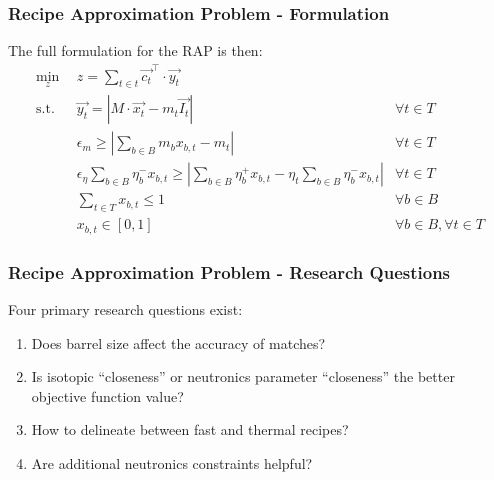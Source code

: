 \begin{frame}[ctb!]
  \frametitle{Recipe Approximation Problem - Formulation}

  The full formulation for the RAP is then:
  \fontsize{7pt}{\baselineskip}\selectfont
  \begin{subequations}\label{eqs:rap}
    \begin{align}
      \min_{z} \:\: & 
      z = \sum_{t \in t} \vec{c_{t}}^{\top} \cdot \vec{y_{t}}
      & \label{eqs:rap_obj} \\
      \text{s.t.} \:\: &
      \vec{y_{t}} = \left| M \cdot \vec{x_{t}}  - m_t \vec{I_{t}} \right|
      &
      \forall t \in T \label{eqs:rap_iso} \\
      &
      \epsilon_{m} \geq \left| \sum_{b \in B} m_{b} x_{b, t} - m_{t} \right|
      & 
      \forall t \in T \label{eqs:rap_mass} \\
      &
      \epsilon_{\eta} \sum_{b \in B} \eta_{b}^{-} x_{b, t} \geq 
      \left| \sum_{b \in B} \eta_{b}^{+} x_{b, t} - 
      \eta_{t} \sum_{b \in B} \eta_{b}^{-} x_{b, t} \right|
      & 
      \forall t \in T \label{eqs:rap_eta} \\
      &
      \sum_{t \in T} x_{b, t} \leq 1
      & 
      \forall b \in B \label{eqs:rap_conserv} \\
      &
      x_{b, t} \in \left[ 0, 1 \right]
      & 
      \forall b \in B, \forall t \in T  \label{eqs:rap_x}
    \end{align}
  \end{subequations}
\end{frame}

\begin{frame}[ctb!]
  \frametitle{Recipe Approximation Problem - Research Questions} 

  Four primary research questions exist:

  \begin{enumerate}
    \item Does barrel size affect the accuracy of matches?
    \item Is isotopic ``closeness'' or neutronics parameter ``closeness'' the
      better objective function value?
    \item How to delineate between fast and thermal recipes?
    \item Are additional neutronics constraints helpful?
  \end{enumerate}
\end{frame}

